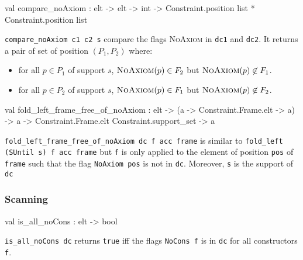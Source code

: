 \begin{ocamldocsigend}
\label{val:Constraint.Deducibility.compare-underscorenoAxiom}\begin{ocamldoccode}
val compare_noAxiom :
  elt ->
  elt ->
  int -> Constraint.position list * Constraint.position list
\end{ocamldoccode}
\begin{ocamldocdescription}
{\tt{compare\_noAxiom c1 c2 s}} compare the flags \textsc{NoAxiom}  in {\tt{dc1}} and {\tt{dc2}}. 
      It returns a pair of set of position $(P_1,P_2)$  where:
      \begin{itemize}
\item for all $p \in P_1$ of support $s$, $\textsc{NoAxiom}(p) \in F_2$ but $\textsc{NoAxiom}(p) \not\in F_1$.  
\item for all $p \in P_2$ of support $s$, $\textsc{NoAxiom}(p) \in F_1$ but $\textsc{NoAxiom}(p) \not\in F_2$.  
\end{itemize}



\end{ocamldocdescription}


\label{val:Constraint.Deducibility.fold-underscoreleft-underscoreframe-underscorefree-underscoreof-underscorenoAxiom}\begin{ocamldoccode}
val fold_left_frame_free_of_noAxiom :
  elt ->
  ({\textquotesingle}a -> Constraint.Frame.elt -> {\textquotesingle}a) ->
  {\textquotesingle}a -> Constraint.Frame.elt Constraint.support_set -> {\textquotesingle}a
\end{ocamldoccode}
\begin{ocamldocdescription}
{\tt{fold\_left\_frame\_free\_of\_noAxiom dc f acc frame}} is similar to {\tt{fold\_left (SUntil s) f acc frame}}
      but {\tt{f}} is only applied to the element of position {\tt{pos}} of {\tt{frame}} such that 
      the flag {\tt{NoAxiom pos}} is not in {\tt{dc}}. Moreover, {\tt{s}} is the support of {\tt{dc}}


\end{ocamldocdescription}


\subsubsection{Scanning}


\label{val:Constraint.Deducibility.is-underscoreall-underscorenoCons}\begin{ocamldoccode}
val is_all_noCons : elt -> bool
\end{ocamldoccode}
\begin{ocamldocdescription}
{\tt{is\_all\_noCons dc}} returns {\tt{true}} iff the flags {\tt{NoCons f}} is in {\tt{dc}} for all constructors {\tt{f}}.



\end{ocamldocdescription}
\end{ocamldocsigend}
